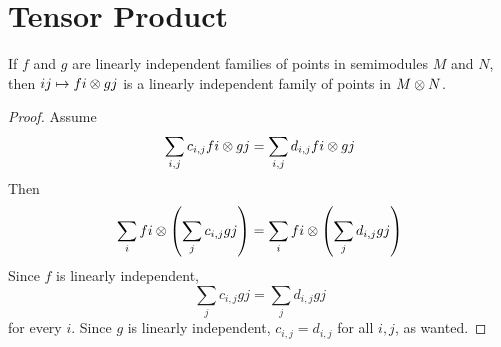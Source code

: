 \section{Tensor Product}


\begin{lemma}
  \label{0-tensor-lin-indep}
  \uses{}
  \leanok

  If $f$ and $g$ are linearly independent families of points in semimodules $M$ and $N$, then $i j \mapsto f i \otimes g j$ is a linearly independent family of points in $M \otimes N$.
\end{lemma}
\begin{proof}
  \uses{}

  Assume
  \[
    \sum_{i, j} c_{i, j} f i \otimes g j = \sum_{i, j} d_{i, j} f i \otimes g j
  \]
  Then
  \[
    \sum_i f i \otimes \left(\sum_j c_{i, j} g j\right) = \sum_i f i \otimes \left(\sum_j d_{i, j} g j\right)
  \]
  Since $f$ is linearly independent,
  \[
    \sum_j c_{i, j} g j = \sum_j d_{i, j} g j
  \]
  for every $i$. Since $g$ is linearly independent, $c_{i, j} = d_{i, j}$ for all $i, j$, as wanted.
\end{proof}
